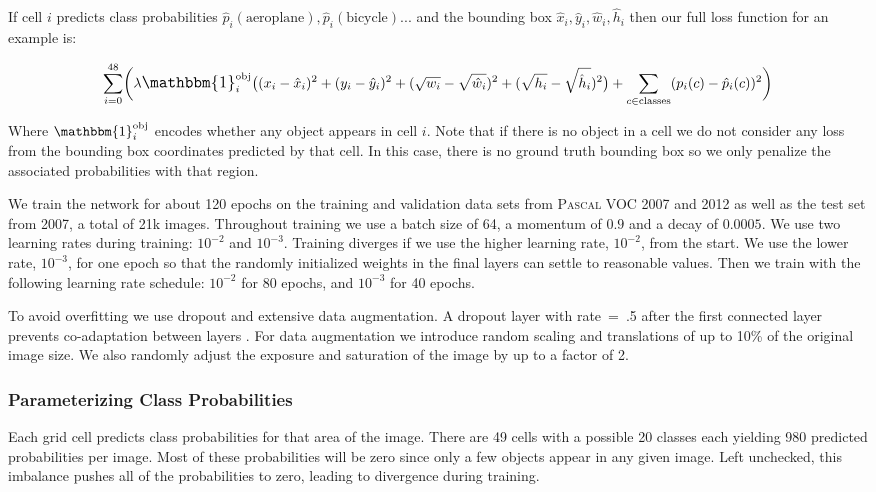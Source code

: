 \documentclass{article} %
\begin{document}
If cell $i$ predicts class probabilities $\hat{p}_i(\text{aeroplane}), \hat{p}_i(\text{bicycle})...$ and the bounding box $\hat{x}_i,\hat{y}_i, \hat{w}_i, \hat{h}_i$ then our full loss function for an example is:

\begin{equation}
\sum_{i = 0}^{48} \biggl( \lambda \mathlarger{\mathbbm{1}}_i^{\text{obj}}\bigl((x_i - \hat{x}_i)^2 + (y_i - \hat{y}_i)^2 + (\sqrt{w_i} - \sqrt{\hat{w}_i})^2 + (\sqrt{h_i} - \sqrt{\hat{h}_i})^2\bigr) + \sum_{c \in \text{classes}} (p_i(c) - \hat{p}_i(c))^2 \biggr)
\end{equation}

Where $\mathbbm{1}_i^{\text{obj}}$ encodes whether any object appears in cell $i$. Note that if there is no object in a cell we do not consider any loss from the bounding box coordinates predicted by that cell. In this case, there is no ground truth bounding box so we only penalize the associated probabilities with that region.

We train the network for about 120 epochs on the training and validation data sets from \textsc{Pascal} VOC 2007 and 2012 as well as the test set from 2007, a total of 21k images. Throughout training we use a batch size of 64, a momentum of $0.9$ and a decay of $0.0005$. We use two learning rates during training: $10^{-2}$ and $10^{-3}$. Training diverges if we use the higher learning rate, $10^{-2}$, from the start. We use the lower rate, $10^{-3}$, for one epoch so that the randomly initialized weights in the final layers can settle to reasonable values. Then we train with the following learning rate schedule: $10^{-2}$ for 80 epochs, and $10^{-3}$ for 40 epochs.

To avoid overfitting we use dropout and extensive data augmentation. A dropout layer with rate~=~.5 after the first connected layer prevents co-adaptation between layers \cite{hinton2012improving}. For data augmentation we introduce random scaling and translations of up to 10\% of the original image size. We also randomly adjust the exposure and saturation of the image by up to a factor of 2.

\subsubsection{Parameterizing Class Probabilities}

Each grid cell predicts class probabilities for that area of the image. There are 49 cells with a possible 20 classes each yielding 980 predicted probabilities per image. Most of these probabilities will be zero since only a few objects appear in any given image. Left unchecked, this imbalance pushes all of the probabilities to zero, leading to divergence during training.
\end{document}

